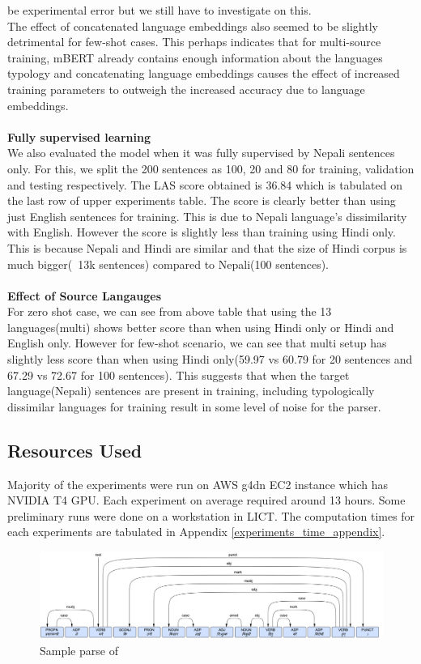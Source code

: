 be experimental error but we still have to investigate on this.
\\
The effect of concatenated language embeddings also seemed to be slightly
detrimental for few-shot cases. This perhaps indicates that for multi-source
training, mBERT already contains enough information about the languages
typology and concatenating language embeddings causes the effect of increased
training parameters to outweigh the increased accuracy due to language embeddings.
\\~\\
\textbf{Fully supervised learning}\\
We also evaluated the model when it was fully supervised by Nepali sentences
only.  For this, we split the 200 sentences as 100, 20 and 80 for training,
validation and testing respectively. The LAS score obtained is 36.84 which is
tabulated on the last row of upper experiments table. The score is clearly
better than using just English sentences for training. This is due to Nepali
language's dissimilarity with English. However the score is  slightly less than
training using Hindi only. This is because Nepali and Hindi are similar and
that the size of Hindi corpus is much bigger(~13k sentences) compared to
Nepali(100 sentences).
\\~\\
\textbf{Effect of Source Langauges}\\
For zero shot case, we can see from above table that using the 13
languages(multi) shows better score than when using Hindi only or Hindi and
English only. However for few-shot scenario, we can see that multi setup has
slightly less score than when using Hindi only(59.97 vs 60.79 for 20 sentences
and 67.29 vs 72.67 for 100 sentences). This suggests that when the target
language(Nepali) sentences are present in training, including typologically
dissimilar languages for training result in some level of noise for the parser.

\subsection*{Resources Used}
Majority of the experiments were run on AWS g4dn EC2 instance which has NVIDIA
T4 GPU.  Each experiment on average required around 13 hours. Some preliminary
runs were done on a workstation in LICT. The computation times for each
experiments are tabulated in Appendix \ref{experiments_time_appendix}.

\begin{figure}[!h]
    \center
    \includegraphics[scale=0.18]{images/sample_result}
    \caption{Sample parse of }
    \label{img:sample_result1}
\end{figure}

